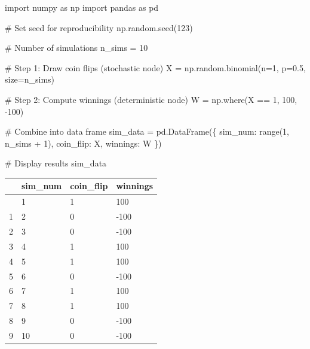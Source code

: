 \documentclass[
  letterpaper,
  DIV=11,
  numbers=noendperiod]{scrartcl}
\newenvironment{Shaded}{\begin{snugshade}}{\end{snugshade}}
\newcommand{\BuiltInTok}[1]{\textcolor[rgb]{0.00,0.23,0.31}{#1}}
\newcommand{\CommentTok}[1]{\textcolor[rgb]{0.37,0.37,0.37}{#1}}
\newcommand{\DecValTok}[1]{\textcolor[rgb]{0.68,0.00,0.00}{#1}}
\newcommand{\FloatTok}[1]{\textcolor[rgb]{0.68,0.00,0.00}{#1}}
\newcommand{\ImportTok}[1]{\textcolor[rgb]{0.00,0.46,0.62}{#1}}
\newcommand{\NormalTok}[1]{\textcolor[rgb]{0.00,0.23,0.31}{#1}}
\newcommand{\OperatorTok}[1]{\textcolor[rgb]{0.37,0.37,0.37}{#1}}
\newcommand{\StringTok}[1]{\textcolor[rgb]{0.13,0.47,0.30}{#1}}
\theoremstyle{definition}
\theoremstyle{remark}
\begin{document}
\begin{Shaded}
\begin{Highlighting}[]
\ImportTok{import}\NormalTok{ numpy }\ImportTok{as}\NormalTok{ np}
\ImportTok{import}\NormalTok{ pandas }\ImportTok{as}\NormalTok{ pd}

\CommentTok{\# Set seed for reproducibility}
\NormalTok{np.random.seed(}\DecValTok{123}\NormalTok{)}

\CommentTok{\# Number of simulations}
\NormalTok{n\_sims }\OperatorTok{=} \DecValTok{10}

\CommentTok{\# Step 1: Draw coin flips (stochastic node)}
\NormalTok{X }\OperatorTok{=}\NormalTok{ np.random.binomial(n}\OperatorTok{=}\DecValTok{1}\NormalTok{, p}\OperatorTok{=}\FloatTok{0.5}\NormalTok{, size}\OperatorTok{=}\NormalTok{n\_sims)}

\CommentTok{\# Step 2: Compute winnings (deterministic node)}
\NormalTok{W }\OperatorTok{=}\NormalTok{ np.where(X }\OperatorTok{==} \DecValTok{1}\NormalTok{, }\DecValTok{100}\NormalTok{, }\OperatorTok{{-}}\DecValTok{100}\NormalTok{)}

\CommentTok{\# Combine into data frame}
\NormalTok{sim\_data }\OperatorTok{=}\NormalTok{ pd.DataFrame(\{}
    \StringTok{\textquotesingle{}sim\_num\textquotesingle{}}\NormalTok{: }\BuiltInTok{range}\NormalTok{(}\DecValTok{1}\NormalTok{, n\_sims }\OperatorTok{+} \DecValTok{1}\NormalTok{),}
    \StringTok{\textquotesingle{}coin\_flip\textquotesingle{}}\NormalTok{: X,}
    \StringTok{\textquotesingle{}winnings\textquotesingle{}}\NormalTok{: W}
\NormalTok{\})}

\CommentTok{\# Display results}
\NormalTok{sim\_data}
\end{Highlighting}
\end{Shaded}

\label{simple-sim-python}
\begin{longtable}[]{@{}llll@{}}
\toprule\noalign{}
& sim\_num & coin\_flip & winnings \\
\midrule\noalign{}
\endhead
\bottomrule\noalign{}
\endlastfoot
0 & 1 & 1 & 100 \\
1 & 2 & 0 & -100 \\
2 & 3 & 0 & -100 \\
3 & 4 & 1 & 100 \\
4 & 5 & 1 & 100 \\
5 & 6 & 0 & -100 \\
6 & 7 & 1 & 100 \\
7 & 8 & 1 & 100 \\
8 & 9 & 0 & -100 \\
9 & 10 & 0 & -100 \\
\end{longtable}
\end{document}
